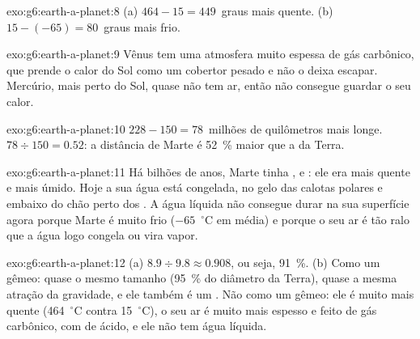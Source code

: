 \begin{solution}{exo:g6:earth-a-planet:8}
(a) $464 - 15 = 449$~graus mais quente. (b) $15 - (-65) = 80$~graus mais frio.
\end{solution}

\begin{solution}{exo:g6:earth-a-planet:9}
Vênus tem uma atmosfera muito espessa de gás carbônico, que prende o calor
do Sol como um cobertor pesado e não o deixa escapar. Mercúrio, mais perto
do Sol, quase não tem ar, então não consegue guardar o seu calor.
\end{solution}

\begin{solution}{exo:g6:earth-a-planet:10}
$228 - 150 = 78$~milhões de quilômetros mais longe. $78 \div 150 = 0.52$:
a distância de Marte é 52~\% maior que a da Terra.
\end{solution}

\begin{solution}{exo:g6:earth-a-planet:11}
Há bilhões de anos, Marte tinha ,  e : ele era mais
quente e mais úmido. Hoje a sua água está congelada, no gelo das calotas
polares e embaixo do chão perto dos . A água líquida não consegue
durar na sua superfície agora porque Marte é muito frio ($-65$~$^\circ$C em
média) e porque o seu ar é tão ralo que a água logo congela ou vira vapor.
\end{solution}

\begin{solution}{exo:g6:earth-a-planet:12}
(a) $8.9 \div 9.8 \approx 0.908$, ou seja, 91~\%. (b) Como um gêmeo: quase
o mesmo tamanho (95~\% do diâmetro da Terra), quase a mesma atração da
gravidade, e ele também é um . Não como um gêmeo: ele é muito
mais quente (464~$^\circ$C contra 15~$^\circ$C), o seu ar é muito mais
espesso e feito de gás carbônico, com  de ácido, e ele não tem água
líquida.
\end{solution}

